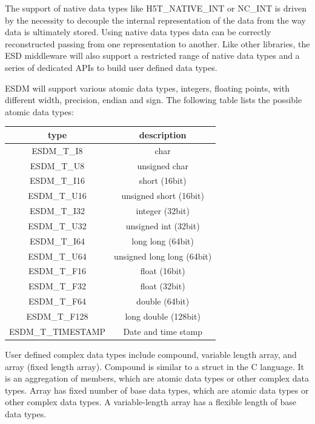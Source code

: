 The support of native data types like H5T\_NATIVE\_INT or NC\_INT is driven by the necessity to decouple the internal representation of the data from the way data is ultimately stored.
Using native data types data can be correctly reconstructed passing from one representation to another.
Like other libraries, the ESD middleware will also support a restricted range of native data types and a series of dedicated APIs to build user defined data types.

\medskip

ESDM will support various atomic data types, integers, floating points, with
different width, precision, endian and sign. The following table lists the
possible atomic data types:

\begin{center}
	\begin{tabular}{|c|c|}
		\hline
		type & description \\
		\hline
		ESDM\_T\_I8     & char                           \\
		ESDM\_T\_U8    & unsigned char                  \\
		ESDM\_T\_I16    & short (16bit)                  \\
		ESDM\_T\_U16   & unsigned short (16bit)         \\
		ESDM\_T\_I32      & integer (32bit)                \\
		ESDM\_T\_U32     & unsigned int (32bit)           \\
		ESDM\_T\_I64    & long long (64bit)              \\
		ESDM\_T\_U64   & unsigned long long (64bit)     \\
		ESDM\_T\_F16    & float (16bit)                  \\
		ESDM\_T\_F32    & float (32bit)                  \\
		ESDM\_T\_F64   & double (64bit)                 \\
		ESDM\_T\_F128 & long double (128bit)           \\
		ESDM\_T\_TIMESTAMP & Date and time stamp \\
		\hline
	\end{tabular}
\end{center}

User defined complex data types include compound, variable length array,
and array (fixed length array).
Compound is similar to a struct in the C language.
It is an aggregation of members, which are atomic data types or other complex
data types.
Array has fixed number of base data types, which are atomic data types
or other complex data types.
A variable-length array has a flexible length of base data types.

